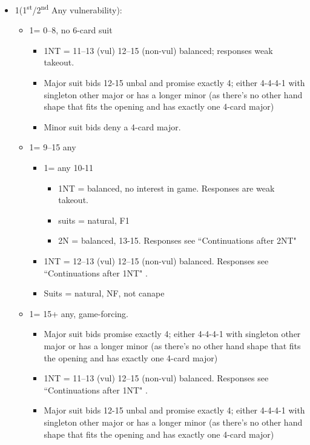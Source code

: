 \documentclass[a4paper,14pt]{extarticle}
\begin{document}
\begin{itemize}
\item 1\clubs (1\textsuperscript{st}/2\textsuperscript{nd} Any vulnerability):
	\begin{itemize}
   \item 1\diamonds = 0--8, no 6-card suit
		\begin{itemize}
      \item 1NT = 11--13 (vul) 12--15 (non-vul) balanced; responses weak takeout.
      \item Major suit bids 12-15 unbal and promise exactly 4; either 4-4-4-1
            with singleton other major or has a longer minor (as there's no other
            hand shape that fits the opening and has exactly one 4-card major)
      \item Minor suit bids deny a 4-card major.
		\end{itemize}
   \item 1\hearts = 9--15 any
		\begin{itemize}
      \item 1\spades = any 10-11
			\begin{itemize}
			\item 1NT = balanced, no interest in game. Responses are weak takeout.
			\item suits = natural, F1
			\item 2N = balanced, 13-15. Responses see ``Continuations after 2NT" 
			\end{itemize}
      \item 1NT = 12--13 (vul) 12--15 (non-vul) balanced. Responses see ``Continuations after 1NT" .
      \item Suits = natural, NF, not canape
		\end{itemize}
   \item 1\spades = 15+ any, game-forcing.
		\begin{itemize}
      \item Major suit bids promise exactly 4; either 4-4-4-1 with singleton other
         major or has a longer minor (as there's no other hand shape that fits the
         opening and has exactly one 4-card major)
      \item 1NT = 11--13 (vul) 12--15 (non-vul) balanced. Responses see ``Continuations after 1NT" .
      \item Major suit bids 12-15 unbal and promise exactly 4; either 4-4-4-1
            with singleton other major or has a longer minor (as there's no other
            hand shape that fits the opening and has exactly one 4-card major)

\end{itemize}
\end{itemize}
\end{itemize}
\end{document}
